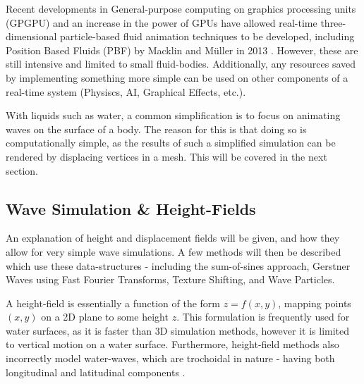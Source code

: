 \documentclass[12pt,a4paper,twoside]{report}
\begin{document}



Recent developments in General-purpose computing on graphics processing units
(GPGPU) and an increase in the power of GPUs have allowed real-time
three-dimensional particle-based fluid animation techniques to be developed,
including Position Based Fluids (PBF) by Macklin and M{\"u}ller in 2013
\cite{Macklin2013}. However, these are still intensive and limited to small
fluid-bodies. Additionally, any resources saved by implementing something more
simple can be used on other components of a real-time system (Physiscs, AI,
Graphical Effects, etc.).

With liquids such as water, a common simplification is to focus on animating
waves on the surface of a body. The reason for this is that doing so is
computationally simple, as the results of such a simplified simulation can be
rendered by displacing vertices in a mesh. This will be covered in the next
section.

\subsection{Wave Simulation \& Height-Fields}
\label{sec:related_height_map}

An explanation of height and displacement fields will be given, and how they
allow for very simple wave simulations. A few methods will then be described
which use these data-structures - including the sum-of-sines approach,
Gerstner Waves using Fast Fourier Transforms, Texture Shifting, and Wave
Particles.

A height-field is essentially a function of the form $z = f(x, y)$, mapping
points $(x, y)$ on a 2D plane to some height $z$. This formulation is
frequently used for water surfaces, as it is faster than 3D simulation methods,
however it is limited to vertical motion on a water surface. Furthermore,
height-field methods also incorrectly model water-waves, which are trochoidal
in nature - having both longitudinal and latitudinal components
\cite{Gerstner1802}.
\end{document}
